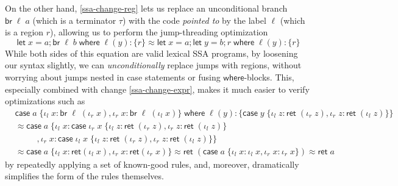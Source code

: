 \documentclass[acmsmall,screen,review]{acmart}
\newcounter{todos}
\newcommand{\TODO}[1]{{
  \stepcounter{todos}
  \begin{center}\large{\textcolor{red}{\textbf{TODO \arabic{todos}:} #1}}\end{center}
}}
\newcommand{\ms}[1]{\ensuremath{\mathsf{#1}}}
\newcommand{\lto}{:}
\newcommand{\linl}[1]{\iota_l\;{#1}}
\newcommand{\linr}[1]{\iota_r\;{#1}}
\newcommand{\letstmt}[3]{\ensuremath{\ms{let}\;#1 = #2; #3}}
\newcommand{\brb}[2]{\ms{br}\;#1\;#2}
\newcommand{\casestmt}[5]{\ms{case}\;#1\;\{\linl{#2} \lto #3, \linr{#4} \lto #5\}}
\newcommand{\where}[2]{#1\;\ms{where}\;#2}
\newcommand{\wbranch}[3]{#1(#2) \lto \{#3\}}
\newcommand{\teqv}{\approx}
\begin{document}
On the other hand, \ref{ssa-change-reg} lets us replace an unconditional branch $\brb{\ell}{a}$
(which is a terminator $\tau$) with the code \emph{pointed to} by the label $\ell$ (which is a
region $r$), allowing us to perform the jump-threading optimization
\begin{equation*}
  \where{\letstmt{x}{a}{\brb{\ell}{b}}}{\wbranch{\ell}{y}{r}}
  \teqv \where{\letstmt{x}{a}{\letstmt{y}{b}{r}}}{\wbranch{\ell}{y}{r}}
\end{equation*}
While both sides of this equation are valid lexical SSA programs, by loosening our syntax slightly,
we can \emph{unconditionally} replace jumps with regions, without worrying about jumps nested in
case statements or fusing \ms{where}-blocks. This, especially combined with change
\ref{ssa-change-expr}, makes it much easier to verify optimizations such as
\begin{align*}
  & \where{\casestmt{a}{x}{\brb{\ell}{(\iota_r\;x)}}{x}{\brb{\ell}{(\iota_l\;x)}}}
        {\wbranch{\ell}{y}{
          \casestmt{y}{z}{\ms{ret}\;(\iota_r\;z)}{z}{\ms{ret}\;(\iota_l\;z)}
        }} \\
  &\teqv \casestmt{a} 
      {x}{\casestmt{\iota_r\;x}{z}{\ms{ret}\;(\iota_r\;z)}{z}{\ms{ret}\;(\iota_l\;z)}   
        \\ & \qquad\;\;}
      {x}{\casestmt{\iota_l\;x}{z}{\ms{ret}\;(\iota_r\;z)}{z}{\ms{ret}\;(\iota_l\;z)}} \\
  &\teqv \casestmt{a}
      {x}{\ms{ret}(\iota_l\;x)}
      {x}{\ms{ret}(\iota_r\;x)}
   \teqv \ms{ret}\;(\casestmt{a}{x}{\iota_l\;x}{x}{\iota_r\;x})
   \teqv \ms{ret}\;a
\end{align*}
by repeatedly applying a set of known-good rules, and, moreover, dramatically simplifies the form of
the rules themselves.

\end{document}
